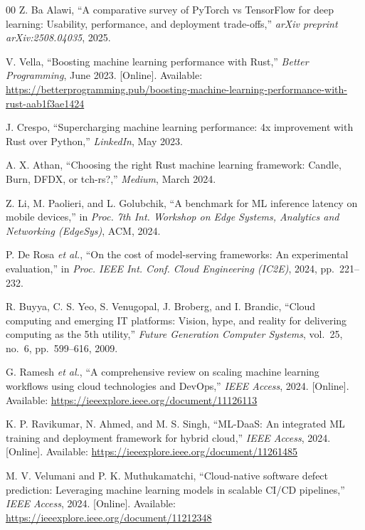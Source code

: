 \documentclass{ieeeaccess}
\begin{document}
\begin{thebibliography}{00}
Z. Ba Alawi, ``A comparative survey of PyTorch vs TensorFlow for deep learning: Usability, performance, and deployment trade-offs,'' \textit{arXiv preprint arXiv:2508.04035}, 2025.

V. Vella, ``Boosting machine learning performance with Rust,'' \textit{Better Programming}, June 2023. [Online]. Available: \url{https://betterprogramming.pub/boosting-machine-learning-performance-with-rust-aab1f3ae1424}

J. Crespo, ``Supercharging machine learning performance: 4x improvement with Rust over Python,'' \textit{LinkedIn}, May 2023.

A. X. Athan, ``Choosing the right Rust machine learning framework: Candle, Burn, DFDX, or tch-rs?,'' \textit{Medium}, March 2024.

Z. Li, M. Paolieri, and L. Golubchik, ``A benchmark for ML inference latency on mobile devices,'' in \textit{Proc. 7th Int. Workshop on Edge Systems, Analytics and Networking (EdgeSys)}, ACM, 2024.

P. De Rosa \textit{et al.}, ``On the cost of model-serving frameworks: An experimental evaluation,'' in \textit{Proc. IEEE Int. Conf. Cloud Engineering (IC2E)}, 2024, pp.~221--232.

R. Buyya, C. S. Yeo, S. Venugopal, J. Broberg, and I. Brandic, ``Cloud computing and emerging IT platforms: Vision, hype, and reality for delivering computing as the 5th utility,'' \textit{Future Generation Computer Systems}, vol.~25, no.~6, pp.~599--616, 2009.

G. Ramesh \textit{et al.}, ``A comprehensive review on scaling machine learning workflows using cloud technologies and DevOps,'' \textit{IEEE Access}, 2024. [Online]. Available: \url{https://ieeexplore.ieee.org/document/11126113}

K. P. Ravikumar, N. Ahmed, and M. S. Singh, ``ML-DaaS: An integrated ML training and deployment framework for hybrid cloud,'' \textit{IEEE Access}, 2024. [Online]. Available: \url{https://ieeexplore.ieee.org/document/11261485}

M. V. Velumani and P. K. Muthukamatchi, ``Cloud-native software defect prediction: Leveraging machine learning models in scalable CI/CD pipelines,'' \textit{IEEE Access}, 2024. [Online]. Available: \url{https://ieeexplore.ieee.org/document/11212348}


\end{thebibliography}
\end{document}
